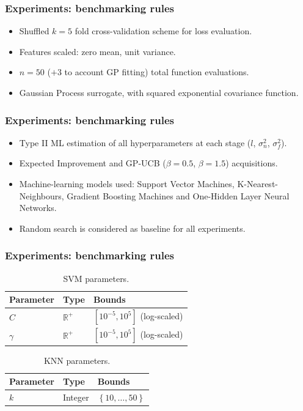 \documentclass[10pt]{beamer}
\begin{document}
		\begin{frame}
		\frametitle{Experiments: benchmarking rules}
		\begin{itemize}
		\item Shuffled $k=5$ fold cross-validation scheme for loss evaluation.
		\item Features scaled: zero mean, unit variance.
		\item $n=50$ ($+3$ to account GP fitting) total function evaluations.
		\item Gaussian Process surrogate, with squared exponential covariance function.
		\end{itemize}
		\end{frame}
		
		\begin{frame}
		\frametitle{Experiments: benchmarking rules}
		\begin{itemize}
		\item Type II ML estimation of all hyperparameters at each stage ($l$, $\sigma_n^2$, $\sigma_f^2$).
		\item Expected Improvement and GP-UCB ($\beta = 0.5$, $\beta = 1.5$) acquisitions.
		\item Machine-learning models used: Support Vector Machines, K-Nearest-Neighbours, Gradient Boosting 			Machines and One-Hidden Layer Neural Networks.
		\item Random search is considered as baseline for all experiments.
		\end{itemize}
		\end{frame}
		
		
		\begin{frame}
		\frametitle{Experiments: benchmarking rules}
		\begin{table}[]
		\centering
		\caption{SVM parameters.}
		\label{svmparam}
		\begin{tabular}{@{}lll@{}}
		\toprule
		\textbf{Parameter} & \textbf{Type}                      & \textbf{Bounds}               \\ \midrule
		$C$                & $\mathbb{R}^+$ & $\left[ 10^{-5}, 10^{5} \right]$ (log-scaled) \\
		$\gamma$           & $\mathbb{R}^+$ & $\left[10^{-5}, 10^{5} \right]$  (log-scaled)       \\ 					\bottomrule
		\end{tabular}
		\end{table}
		
		\begin{table}[]
		\centering
		\caption{KNN parameters.}
		\label{knnparams}
		\begin{tabular}{@{}lll@{}}
		\toprule
		\textbf{Parameter} & \textbf{Type} & \textbf{Bounds}                           \\ \midrule
		$k$                & Integer       & $\left\lbrace 10, \dots,50 \right\rbrace$
		\end{tabular}
		\end{table}
		\end{frame}
		
\end{document}
